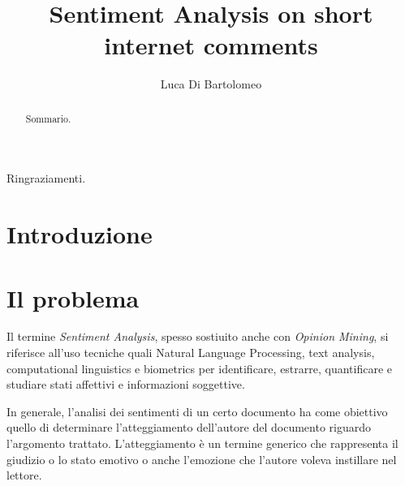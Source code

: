 \documentclass[Lau,binding=0.6cm]{sapthesis}
\title{Sentiment Analysis on short internet comments}
\author{Luca Di Bartolomeo}
\begin{document}
\frontmatter

\maketitle

\dedication{Dedicato a\\ Donald Knuth}

\begin{abstract}
Sommario.
\end{abstract}

\begin{acknowledgments}
Ringraziamenti.
\end{acknowledgments}

\tableofcontents



\Large


\mainmatter

\chapter{Introduzione}

\chapter{Il problema}

Il termine \emph{Sentiment Analysis}, spesso sostiuito anche con \emph{Opinion
Mining}, si riferisce all'uso tecniche quali Natural Language Processing, text
analysis, computational linguistics e biometrics per identificare, estrarre,
quantificare e studiare stati affettivi e 
informazioni soggettive. 

In generale, l'analisi dei sentimenti di un certo documento ha come obiettivo quello di determinare l'atteggiamento dell'autore del 
documento riguardo l'argomento trattato. L'atteggiamento è un termine generico che rappresenta il giudizio o lo stato emotivo o anche l'emozione che l'autore voleva
instillare nel lettore.
\end{document}
